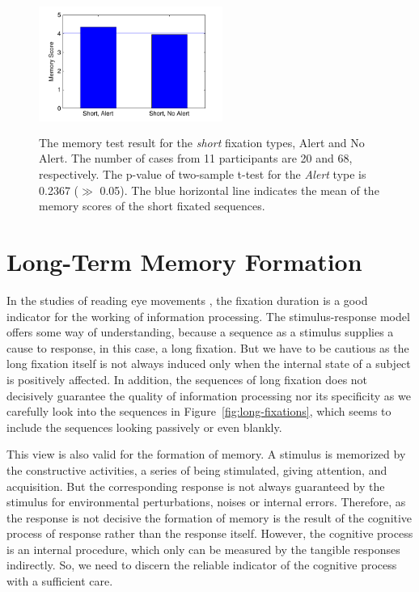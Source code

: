 \documentclass[10pt,letterpaper]{article}
\begin{document}
\begin{figure}
  \centerline{\includegraphics[width=60mm,height=44mm,trim=9mm 3mm 12mm 3mm]{./eps/memtest_short.pdf}}
  \caption{The memory test result for the \textit{short} fixation types, Alert and No Alert. The number of cases from 11 participants are 20 and 68, respectively. The p-value of two-sample t-test for the \textit{Alert} type is 0.2367 ($\gg$ 0.05). The blue horizontal line indicates the mean of the memory scores of the short fixated sequences.}
  \label{fig:memtest-short}
\end{figure}


\section{Long-Term Memory Formation}

In the studies of reading eye movements \cite{Rayner1998}, the fixation duration is a good indicator for the working of information processing. The stimulus-response model offers some way of understanding, because a sequence as a stimulus supplies a cause to response, in this case, a long fixation. But we have to be cautious as the long fixation itself is not always induced only when the internal state of a subject is positively affected. In addition, the sequences of long fixation does not decisively guarantee the quality of information processing nor its specificity as we carefully look into the sequences in Figure~\ref{fig:long-fixations}, which seems to include the sequences looking passively or even blankly. 

This view is also valid for the formation of memory. A stimulus is memorized by the constructive activities, a series of being stimulated, giving attention, and acquisition. But the corresponding response is not always guaranteed by the stimulus for environmental perturbations, noises or internal errors. Therefore, as the response is not decisive the formation of memory is the result of the cognitive process of response rather than the response itself. However, the cognitive process is an internal procedure, which only can be measured by the tangible responses indirectly. So, we need to discern the reliable indicator of the cognitive process with a sufficient care. 
\end{document}

